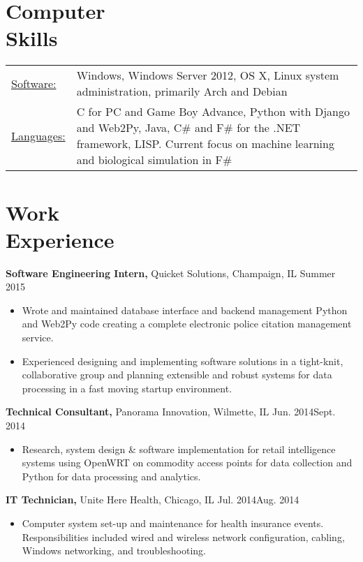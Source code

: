 \documentclass[margin]{res}
\begin{document}
\begin{resume}
\section{Computer \\ Skills}
  \begin{tabular}{l p{3in}}
    \underline{Software:} & Windows, Windows Server 2012, OS X, Linux system administration, primarily Arch and Debian \\
    \underline{Languages:} & C for PC and Game Boy Advance, Python with Django and Web2Py, Java, C\# and F\# for the .NET framework, LISP. Current focus on machine learning and biological simulation in F\#
 \end{tabular}

\section{Work \\ Experience}

{\bf Software Engineering Intern,} Quicket Solutions, Champaign, IL \hfill Summer 2015
\begin{itemize} \itemsep -2pt  %
\item Wrote and maintained database interface and backend management Python and Web2Py code creating a complete electronic police citation management service.
\item Experienced designing and implementing software solutions in a tight-knit, collaborative group and planning extensible and robust systems for data processing in a fast moving startup environment.
\end{itemize}

{\bf Technical Consultant,} Panorama Innovation, Wilmette, IL \hfill Jun. 2014\textendash Sept. 2014
\begin{itemize} \itemsep -2pt  %
\item Research, system design \& software implementation for retail intelligence systems using OpenWRT on commodity access points for data collection and Python for data processing and analytics.
\end{itemize}

{\bf IT Technician,} Unite Here Health, Chicago, IL \hfill Jul. 2014\textendash Aug. 2014
\begin{itemize} \itemsep -2pt  %
\item Computer system set-up and maintenance for health insurance events. Responsibilities included wired and wireless network configuration, cabling, Windows networking, and troubleshooting.
\end{itemize}


\end{resume}
\end{document}
